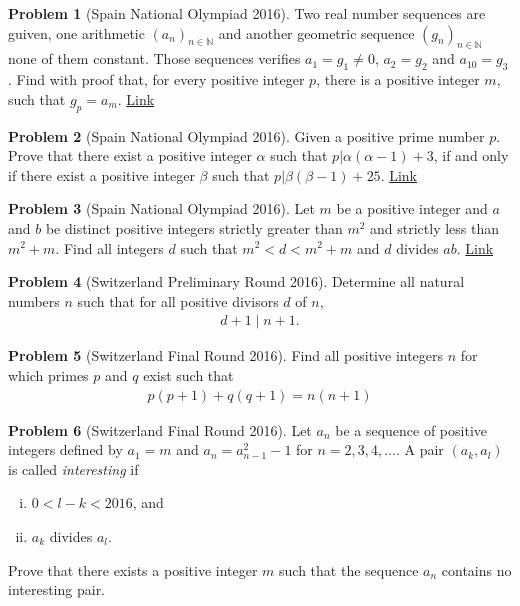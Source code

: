 \documentclass[]{article}
\theoremstyle{definition}
\newtheorem{problem}{Problem}
\begin{document}
\begin{problem}[Spain National Olympiad 2016]
	Two real number sequences are guiven, one arithmetic $\left(a_n\right)_{n\in \mathbb {N}}$ and another geometric sequence $\left(g_n\right)_{n\in \mathbb {N}}$ none of them constant. Those sequences verifies $a_1=g_1\neq 0$, $a_2=g_2$ and $a_{10}=g_3$. Find with proof that, for every positive integer $p$, there is a positive integer $m$, such that $g_p=a_m$. \hfill \href{http://artofproblemsolving.com/community/c6h1221152p6106939}{Link}
\end{problem}



\begin{problem}[Spain National Olympiad 2016]
	Given a positive prime number $p$. Prove that there exist a positive integer $\alpha$ such that $p|\alpha(\alpha-1)+3$, if and only if there exist a positive integer $\beta$ such that $p|\beta(\beta-1)+25$. \hfill \href{http://artofproblemsolving.com/community/c6h1221267p6107917}{Link}
\end{problem}



\begin{problem}[Spain National Olympiad 2016]
	Let $m$ be a positive integer and $a$ and $b$ be distinct positive integers strictly greater than $m^2$ and strictly less than $m^2+m$. Find all integers $d$ such that $m^2 < d < m^2+m$ and $d$ divides $ab$. \hfill \href{http://artofproblemsolving.com/community/c6h1290418p6823262}{Link}
\end{problem}




\begin{problem}[Switzerland Preliminary Round 2016]
	Determine all natural numbers $n$ such that for all positive divisors $d$ of $n$,
		\begin{align*}
			d + 1 \mid n + 1.
		\end{align*}
\end{problem}



\begin{problem}[Switzerland Final Round 2016]
	Find all positive integers $n$ for which primes $p$ and $q$ exist such that
		\begin{align*}
			p(p+1) + q(q+1) = n(n+1)
		\end{align*}
\end{problem}


\begin{problem}[Switzerland Final Round 2016]
	Let $a_n$ be a sequence of positive integers defined by $a_1 = m$ and $a_{n} = a_{n-1}^2 - 1$ for $n= 2, 3, 4, \dots$. A pair $(a_k, a_l)$ is called \textit{interesting} if
	\begin{enumerate}[(i)]
		\item $0 < l - k < 2016$, and
		\item $a_k$ divides $a_l$.
	\end{enumerate}
	Prove that there exists a positive integer $m$ such that the sequence $a_n$ contains no interesting pair.
\end{problem}
\end{document}
